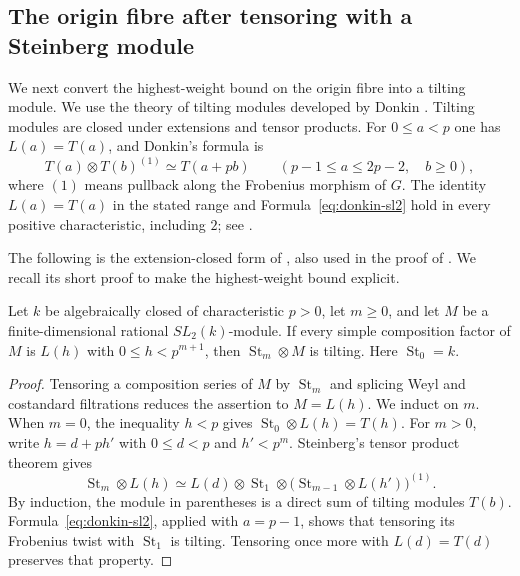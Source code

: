\subsection{The origin fibre after tensoring with a Steinberg module}
\label{subsec:bounded-tilting}

We next convert the highest-weight bound on the origin fibre into a tilting
module. We use the theory of tilting modules developed by Donkin
\cite{Donkin1993}. Tilting modules are closed under extensions and tensor products.
For $0\leq a<p$ one has $L(a)=T(a)$, and Donkin's formula is
\begin{equation}\label{eq:donkin-sl2}
 T(a)\otimes T(b)^{(1)}\simeq T(a+pb)
 \qquad(p-1\leq a\leq2p-2,\quad b\geq0),
\end{equation}
where $(1)$ means pullback along the Frobenius morphism of $G$.
The identity $L(a)=T(a)$ in the stated range and Formula~\eqref{eq:donkin-sl2}
hold in every positive characteristic, including $2$;
see \cite[Proposition~3.1]{BEO2023}.

The following is the extension-closed form of
\cite[Lemma~3.3]{BEO2023}, also used in the proof of
\cite[Lemma~3.1.6]{CoulembierFlakeSteinberg}.  We recall its short proof
to make the highest-weight bound explicit.

\begin{lemma}\label{lem:bounded-tilting}
Let $k$ be algebraically closed of characteristic $p>0$, let $m\geq0$,
and let $M$ be a finite-dimensional rational $SL_2(k)$-module.
If every simple composition factor of $M$ is $L(h)$ with
$0\leq h<p^{m+1}$, then $\operatorname{St}_m\otimes M$ is tilting.
Here $\operatorname{St}_0=k$.
\end{lemma}

\begin{proof}
Tensoring a composition series of $M$ by $\operatorname{St}_m$ and splicing
Weyl and costandard filtrations reduces the assertion to $M=L(h)$.
We induct on $m$.  When $m=0$, the inequality $h<p$ gives
$\operatorname{St}_0\otimes L(h)=T(h)$.
For $m>0$, write $h=d+ph'$ with $0\leq d<p$ and $h'<p^m$.
Steinberg's tensor product theorem gives
\[
 \operatorname{St}_m\otimes L(h)
 \simeq
 L(d)\otimes\operatorname{St}_1\otimes
 \bigl(\operatorname{St}_{m-1}\otimes L(h')\bigr)^{(1)}.
\]
By induction, the module in parentheses is a direct sum of tilting
modules $T(b)$.  Formula~\eqref{eq:donkin-sl2}, applied with $a=p-1$,
shows that tensoring its Frobenius twist with $\operatorname{St}_1$
is tilting.  Tensoring once more with $L(d)=T(d)$ preserves that property.
\end{proof}

